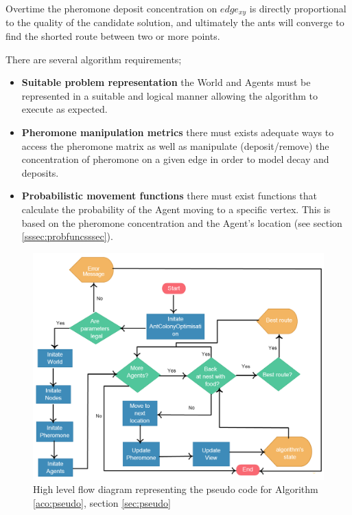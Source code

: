 Overtime the pheromone deposit concentration on $edge_{xy}$ is directly proportional to the quality of the candidate solution, and ultimately the ants will converge to find the shorted route between two or more points.

There are several algorithm requirements;
\begin{itemize}
\item \textbf{Suitable problem representation} the World and Agents must be represented in a suitable and logical manner allowing the algorithm to execute as expected.
\item \textbf{Pheromone manipulation metrics} there must exists adequate ways to access the pheromone matrix as well as manipulate (deposit/remove) the concentration of pheromone on a given edge in order to model decay and deposits.
\item \textbf{Probabilistic movement functions} there must exist functions that calculate the probability of the Agent moving to a specific vertex. This is based on the pheromone concentration and the Agent’s location (see section \ref{sssec:probfuncsssec}).
\end{itemize}

\clearpage
\begin{figure}
\centering
\includegraphics[scale= 0.45]{Images/design/flowmain}
\caption[High Level Flow Diagram]{High level flow diagram representing the pseudo code for Algorithm \ref{aco:pseudo}, section \ref{sec:pseudo}}
\label{fig:flowmain}
\end{figure}
\clearpage

